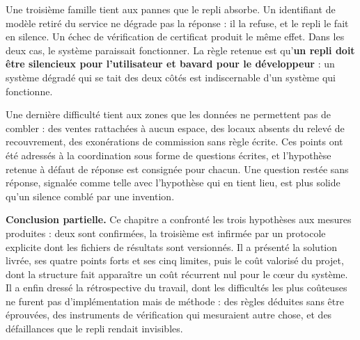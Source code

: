 Une troisième famille tient aux pannes que le repli absorbe. Un identifiant de modèle retiré du service ne dégrade pas la réponse : il la refuse, et le repli le fait en silence. Un échec de vérification de certificat produit le même effet. Dans les deux cas, le système paraissait fonctionner. La règle retenue est qu'\textbf{un repli doit être silencieux pour l'utilisateur et bavard pour le développeur} : un système dégradé qui se tait des deux côtés est indiscernable d'un système qui fonctionne.

Une dernière difficulté tient aux zones que les données ne permettent pas de combler : des ventes rattachées à aucun espace, des locaux absents du relevé de recouvrement, des exonérations de commission sans règle écrite. Ces points ont été adressés à la coordination sous forme de questions écrites, et l'hypothèse retenue à défaut de réponse est consignée pour chacun. Une question restée sans réponse, signalée comme telle avec l'hypothèse qui en tient lieu, est plus solide qu'un silence comblé par une invention.

\vspace{1em}
\noindent\textbf{Conclusion partielle.} Ce chapitre a confronté les trois hypothèses aux mesures produites : deux sont confirmées, la troisième est infirmée par un protocole explicite dont les fichiers de résultats sont versionnés. Il a présenté la solution livrée, ses quatre points forts et ses cinq limites, puis le coût valorisé du projet, dont la structure fait apparaître un coût récurrent nul pour le cœur du système. Il a enfin dressé la rétrospective du travail, dont les difficultés les plus coûteuses ne furent pas d'implémentation mais de méthode : des règles déduites sans être éprouvées, des instruments de vérification qui mesuraient autre chose, et des défaillances que le repli rendait invisibles.
